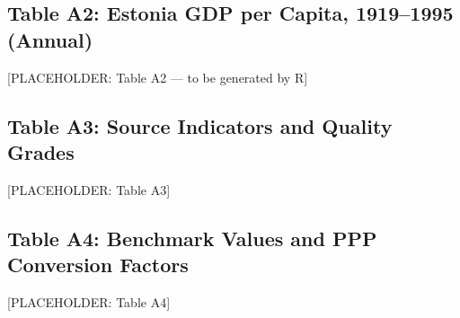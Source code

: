 \documentclass[12pt,a4paper]{article}
\begin{document}
\subsection*{Table A2: Estonia GDP per Capita, 1919--1995 (Annual)}
\label{tab:a2}
[PLACEHOLDER: Table A2 — to be generated by R]

\subsection*{Table A3: Source Indicators and Quality Grades}
\label{tab:a3}
[PLACEHOLDER: Table A3]

\subsection*{Table A4: Benchmark Values and PPP Conversion Factors}
\label{tab:a4}
[PLACEHOLDER: Table A4]

\end{document}
